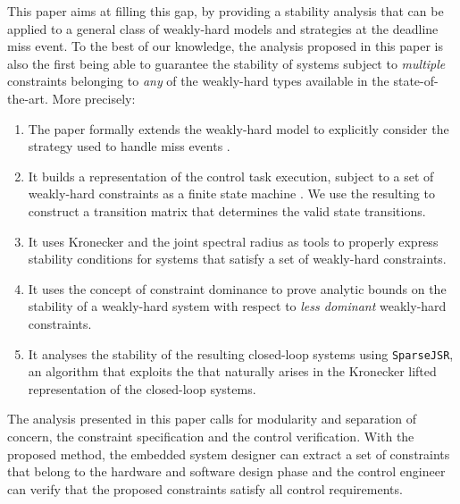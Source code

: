 This paper aims at filling this gap, by providing a stability analysis that can be applied to a general class of weakly-hard models and strategies at the deadline miss event.
To the best of our knowledge, the analysis proposed in this paper is also the first being able to guarantee the stability of systems subject to \emph{multiple} constraints belonging to \emph{any} of the weakly-hard types available in the state-of-the-art.
More precisely:
\begin{enumerate}[label=(\roman*)]
    \item The paper formally extends the weakly-hard model to explicitly consider the strategy used to handle  miss events . %
    \item It builds a representation of the control task execution, subject to a set of weakly-hard constraints as a finite state machine . We use the resulting  to construct a transition matrix that determines the valid state transitions.
    \item It uses Kronecker  and the joint spectral radius as tools to properly express stability conditions for systems that satisfy a set of weakly-hard constraints.
    \item It uses the concept of constraint dominance to prove analytic bounds on the stability of a weakly-hard system with respect to \emph{less dominant} weakly-hard constraints.
    \item It analyses the stability of the resulting closed-loop systems using \texttt{SparseJSR}, an algorithm that exploits the  that naturally arises in the Kronecker lifted representation of the closed-loop systems.
\end{enumerate}

The analysis presented in this paper calls for modularity and separation of concern,  the constraint specification and the control verification. 
With the proposed method, the embedded system designer can extract a set of constraints that belong to the hardware and software design phase and the control engineer can verify that the proposed constraints satisfy all control requirements. 

